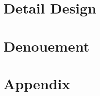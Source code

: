 \part{Detail Design}

\part{Denouement}

\cleardoublepage

%
%
\appendix
\cleardoublepage
\part{Appendix}

\cleardoublepage

\label{app:bibliography} 







